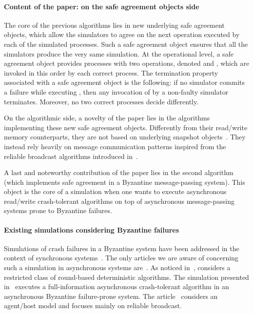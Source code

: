 \documentclass[11pt,letterpaper]{article}
\begin{document}
\paragraph{Content of the paper: on the safe agreement objects side}
The core of the previous algorithms  lies in 
  new  underlying safe agreement objects, which allow the
 simulators to agree on the next operation executed by each of the 
simulated  processes. Such a  safe agreement object ensures that all the
simulators produce the very same simulation. At the operational level,
a safe agreement object
provides processes with two operations, denoted 
and , which  are invoked in this order by each correct process.
The termination property associated with  a safe agreement object  is
the following: if no simulator commits a failure while executing
, then any invocation of  
by a non-faulty simulator terminates. Moreover, no two correct processes 
decide differently. 

On the algorithmic side, a novelty of the paper lies in the algorithms
implementing these new safe agreement objects. Differently from their
read/write memory counterparts, they are not based on underlying
snapshot objects~\cite{AADGMS93}.  They instead rely heavily on
message communication patterns inspired from the reliable broadcast
algorithms  introduced in~\cite{B87}.

A last and noteworthy contribution of the paper lies in the second algorithm
(which implements safe agreement in a  Byzantine message-passing system).
This object is the core of a simulation when one wants to execute     
asynchronous read/write crash-tolerant algorithms  on top of asynchronous
message-passing systems prone to Byzantine failures.


\paragraph{Existing simulations considering Byzantine failures}
Simulations of crash failures in a Byzantine system have been
addressed in the context of synchronous systems~\cite{BN91,NT90,ST87}.
The only articles we are aware of concerning such a simulation in
asynchronous systems are~\cite{C88,HKR14,HDR07}.  As noticed
in~\cite{AW04}, \cite{C88} considers a restricted class of round-based
deterministic algorithms.  The
simulation presented in~\cite{HKR14} executes a full-information
asynchronous crash-tolerant algorithm in an asynchronous Byzantine
failure-prone system. The article~\cite{HDR07} considers an
agent/host model and focuses mainly on reliable broadcast. 
\end{document}
